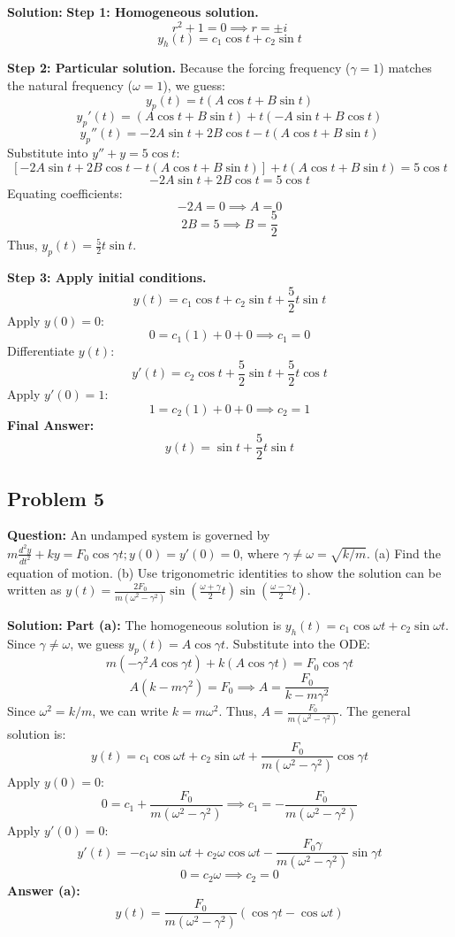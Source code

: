 \documentclass[11pt]{article}
\begin{document}
\textbf{Solution:}
\textbf{Step 1: Homogeneous solution.}
\[ r^2 + 1 = 0 \implies r = \pm i \]
\[ y_h(t) = c_1 \cos t + c_2 \sin t \]

\textbf{Step 2: Particular solution.}
Because the forcing frequency ($\gamma = 1$) matches the natural frequency ($\omega = 1$), we guess:
\[ y_p(t) = t(A \cos t + B \sin t) \]
\[ y_p'(t) = (A \cos t + B \sin t) + t(-A \sin t + B \cos t) \]
\[ y_p''(t) = -2A \sin t + 2B \cos t - t(A \cos t + B \sin t) \]
Substitute into $y'' + y = 5 \cos t$:
\[ [-2A \sin t + 2B \cos t - t(A \cos t + B \sin t)] + t(A \cos t + B \sin t) = 5 \cos t \]
\[ -2A \sin t + 2B \cos t = 5 \cos t \]
Equating coefficients:
\[ -2A = 0 \implies A = 0 \]
\[ 2B = 5 \implies B = \frac{5}{2} \]
Thus, $y_p(t) = \frac{5}{2} t \sin t$.

\textbf{Step 3: Apply initial conditions.}
\[ y(t) = c_1 \cos t + c_2 \sin t + \frac{5}{2} t \sin t \]
Apply $y(0) = 0$:
\[ 0 = c_1(1) + 0 + 0 \implies c_1 = 0 \]
Differentiate $y(t)$:
\[ y'(t) = c_2 \cos t + \frac{5}{2} \sin t + \frac{5}{2} t \cos t \]
Apply $y'(0) = 1$:
\[ 1 = c_2(1) + 0 + 0 \implies c_2 = 1 \]
\textbf{Final Answer:}
\[ y(t) = \sin t + \frac{5}{2} t \sin t \]

\subsection{Problem 5}
\textbf{Question:} An undamped system is governed by $m \frac{d^2y}{dt^2} + ky = F_0 \cos \gamma t ; y(0)=y'(0)=0$, where $\gamma \neq \omega = \sqrt{k/m}$.
(a) Find the equation of motion.
(b) Use trigonometric identities to show the solution can be written as $y(t) = \frac{2F_0}{m(\omega^2 - \gamma^2)} \sin\left(\frac{\omega+\gamma}{2}t\right) \sin\left(\frac{\omega-\gamma}{2}t\right)$.

\textbf{Solution:}
\textbf{Part (a):}
The homogeneous solution is $y_h(t) = c_1 \cos \omega t + c_2 \sin \omega t$.
Since $\gamma \neq \omega$, we guess $y_p(t) = A \cos \gamma t$.
Substitute into the ODE:
\[ m(-\gamma^2 A \cos \gamma t) + k(A \cos \gamma t) = F_0 \cos \gamma t \]
\[ A(k - m\gamma^2) = F_0 \implies A = \frac{F_0}{k - m\gamma^2} \]
Since $\omega^2 = k/m$, we can write $k = m\omega^2$. Thus, $A = \frac{F_0}{m(\omega^2 - \gamma^2)}$.
The general solution is:
\[ y(t) = c_1 \cos \omega t + c_2 \sin \omega t + \frac{F_0}{m(\omega^2 - \gamma^2)} \cos \gamma t \]
Apply $y(0) = 0$:
\[ 0 = c_1 + \frac{F_0}{m(\omega^2 - \gamma^2)} \implies c_1 = -\frac{F_0}{m(\omega^2 - \gamma^2)} \]
Apply $y'(0) = 0$:
\[ y'(t) = -c_1 \omega \sin \omega t + c_2 \omega \cos \omega t - \frac{F_0 \gamma}{m(\omega^2 - \gamma^2)} \sin \gamma t \]
\[ 0 = c_2 \omega \implies c_2 = 0 \]
\textbf{Answer (a):}
\[ y(t) = \frac{F_0}{m(\omega^2 - \gamma^2)} (\cos \gamma t - \cos \omega t) \]
\end{document}
